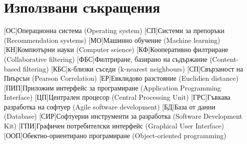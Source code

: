 \chapter{Използвани съкращения}
	\begin{acronym}
		[ОС]{Операционна система (Operating system)}
		[СП]{Системи за препоръки (Recommendation systems)}
		[МО]{Машинно обучение (Machine learning)}
		[КН]{Компютърни науки (Computer science)}
		[КФ]{Кооперативно филтриране (Collaborative filtering)}
		[ФБС]{Филтриране, базирано на съдържание (Content-based filtering)}
		[КБС]{к-близки съседи (k-nearest neighbours)}
		[СП]{Свързаност на Пиърсън (Pearson Correlation)}
		[ЕР]{Евклидово разстояние (Euclidien distance)}
		[ПИП]{Приложим интерфейс за програмиране (Application Programming Interface)}
		[ЦП]{Централен процесор (Central Processing Unit)}
		[ГРС]{Гъвкава разработка на софтуер (Agile software development)}
		[БД]{База от данни (Database)}
		[СИР]{Софтуерни инструменти за разработка (Software Development Kit)}
		[ГПИ]{Графичен потребителски интерфейс (Graphical User Interface)}
		[ООП]{Обектно-ориентирано програмиране (Object-oriented programming)}
	\end{acronym}